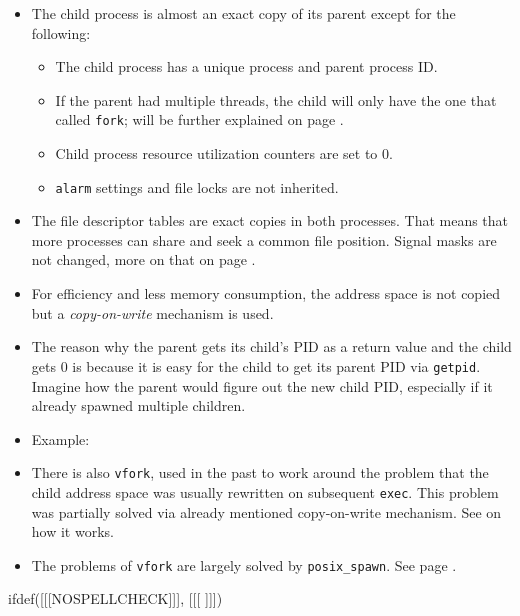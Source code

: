 \begin{itemize}
\item \label{FORK} The child process is almost an exact copy of its parent
except for the following:
\begin{itemize}
\item The child process has a unique process and parent process ID.
\item If the parent had multiple threads, the child will only have the one that
called \texttt{fork}; will be further explained on page \pageref{FORKALL}.
\item Child process resource utilization counters are set to 0.
\item \texttt{alarm} settings and file locks are not inherited.
\end{itemize}
\item The file descriptor tables are exact copies in both processes.  That means
that more processes can share and seek a common file position.  Signal masks are
not changed, more on that on page \pageref{SIGNALBLOCKINGEXAMPLE}.
\item For efficiency and less memory consumption, the address space is not copied
but a \emph{copy-on-write} mechanism is used.
\item The reason why the parent gets its child's PID as a return value and the
child gets 0 is because it is easy for the child to get its parent PID via
\texttt{getpid}.  Imagine how the parent would figure out the new child PID,
especially if it already spawned multiple children.
\item Example: 
\item \label{VFORK} There is also \texttt{vfork}, used in the past to work
around the problem that the child address space was usually rewritten on
subsequent \texttt{exec}.  This problem was partially solved via already
mentioned copy-on-write mechanism.  See  on how it works.
\item The problems of \texttt{vfork} are largely solved by
\texttt{posix\_spawn}. See page \pageref{SPAWN}.
\end{itemize}


ifdef([[[NOSPELLCHECK]]], [[[
]]])

